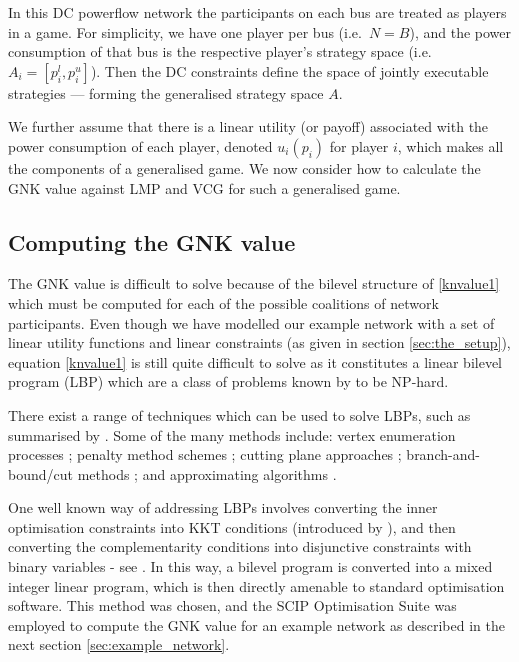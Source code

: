 In this DC powerflow network the participants on each bus are treated as players in a game.
For simplicity, we have one player per bus (i.e.~$N=B$), and the power consumption of that bus is the respective player's strategy space (i.e.\ $A_i=[p_i^l,p_i^u]$).
Then the DC constraints define the space of jointly executable strategies --- forming the generalised strategy space $A$.

We further assume that there is a linear utility (or payoff) associated with the power consumption of each player, denoted $u_i(p_i)$ for player $i$, which makes all the components of a generalised game.
We now consider how to calculate the GNK value against LMP and VCG for such a generalised game.






\subsection{Computing the GNK value}\label{subsec:gnk_compute1}

The GNK value is difficult to solve because of the bilevel structure of \eqref{knvalue1} which must be computed for each of the possible coalitions of network participants.
Even though we have modelled our example network with a set of linear utility functions and linear constraints (as given in section \ref{sec:the_setup}), equation \eqref{knvalue1} is still quite difficult to solve as it constitutes a linear bilevel program (LBP) which are a class of problems known by to be NP-hard. \citep{DBLP:journals/tec/SinhaMD18,Ben-Ayed:1990:CDB} 

There exist a range of techniques which can be used to solve LBPs, such as summarised by \cite{DBLP:journals/tec/SinhaMD18,S.Dempe.Optimisations}.
Some of the many methods include: vertex enumeration processes \citep{Bialas:1984:TLP:2784019.2784026,Shi:2005:EKA:2641854.2642183,LIU1995644}; penalty method schemes \citep{KleinertSchmidt2019,ONAL1993126,dempe_optimisation111};
cutting plane approaches \citep{cuttingplane1};
branch-and-bound/cut methods \citep{SHI200551,Hansen:1992:NBR:141164.141181,Audet2007};
and approximating algorithms \citep{Pineda2018,rnnlbp1,genetic_algirthm_blp}.

One well known way of addressing LBPs involves converting the inner optimisation constraints into KKT conditions (introduced by \cite{kuhn1951nonlinear}), and then converting the complementarity conditions into disjunctive constraints with binary variables - see \cite{Fortuny-Amat1981,Pineda2018}.
In this way, a bilevel program is converted into a mixed integer linear program, which is then directly amenable to standard optimisation software.
This method was chosen, and the SCIP Optimisation Suite was employed to compute the GNK value for an example network as described in the next section \ref{sec:example_network}.

